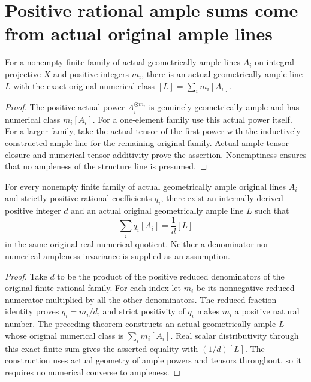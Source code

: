 \section{Positive rational ample sums come from actual original ample lines}
\label{sec:native-numerical-rational-ample-lines}

\begin{lemma}
\label{lem:native-numerical-integer-ample-line-sums}
\leanok
{}
For a nonempty finite family of actual geometrically ample lines $A_i$
on integral projective $X$ and positive integers $m_i$, there is an
actual geometrically ample line $L$ with the exact original numerical
class $[L]=\sum_i m_i[A_i]$.
\end{lemma}
\begin{proof}
The positive actual power $A_i^{\otimes m_i}$ is genuinely geometrically
ample and has numerical class $m_i[A_i]$. For a one-element family use
this actual power itself. For a larger family, take the actual tensor
of the first power with the inductively constructed ample line for the
remaining original family. Actual ample tensor closure and numerical
tensor additivity prove the assertion. Nonemptiness ensures that no
ampleness of the structure line is presumed.
\end{proof}

\begin{theorem}
\label{thm:native-numerical-rational-ample-lines}
\leanok
{}
For every nonempty finite family of actual geometrically ample original
lines $A_i$ and strictly positive rational coefficients $q_i$, there
exist an internally derived positive integer $d$ and an actual original
geometrically ample line $L$ such that
\[
 \sum_i q_i[A_i]=\frac1d[L]
\]
in the same original real numerical quotient. Neither a denominator nor
numerical ampleness invariance is supplied as an assumption.
\end{theorem}
\begin{proof}
Take $d$ to be the product of the positive reduced denominators of the
original finite rational family. For each index let $m_i$ be its
nonnegative reduced numerator multiplied by all the other denominators.
The reduced fraction identity proves $q_i=m_i/d$, and strict positivity
of $q_i$ makes $m_i$ a positive natural number. The preceding theorem
constructs an actual geometrically ample $L$ whose original numerical
class is $\sum_i m_i[A_i]$. Real scalar distributivity through this exact
finite sum gives the asserted equality with $(1/d)[L]$. The construction
uses actual geometry of ample powers and tensors throughout, so it
requires no numerical converse to ampleness.
\end{proof}
